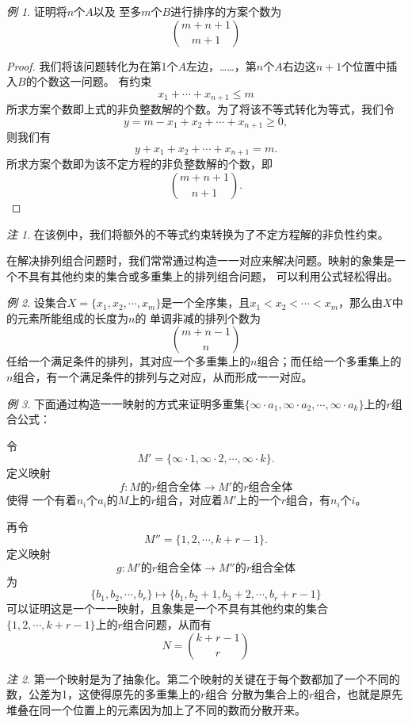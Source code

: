 \documentclass[a4paper,11pt]{article}%
\theoremstyle{remark}
\newtheorem*{remark}{注}
\theoremstyle{remark}
\newtheorem*{example}{例}
\theoremstyle{definition}
\theoremstyle{definition}
\theoremstyle{definition}
\begin{document}
\begin{example}
    证明将$n$个$A$以及 至多$m$个$B$进行排序的方案个数为
    \[\binom{m+n+1}{m+1}\]
    \begin{proof}
        我们将该问题转化为在第1个$A$左边，……，第$n$个$A$右边这$n+1$个位置中插入$B$的个数这一问题。
        有约束
        \[x_1+\cdots+x_{n+1}\leq m\]
        所求方案个数即上式的非负整数解的个数。为了将该不等式转化为等式，我们令
        \[y=m-x_1+x_2+\cdots+x_{n+1}\geq 0,\]
        则我们有
        \[y+x_1+x_2+\cdots+x_{n+1}=m.\]
        所求方案个数即为该不定方程的非负整数解的个数，即
        \[\binom{m+n+1}{n+1}.\]
    \end{proof}
\end{example}
\begin{remark}
    在该例中，我们将额外的不等式约束转换为了不定方程解的非负性约束。
\end{remark}
在解决排列组合问题时，我们常常通过构造一一对应来解决问题。映射的象集是一个不具有其他约束的集合或多重集上的排列组合问题，
可以利用公式轻松得出。
\begin{example}
    设集合$X=\{x_1,x_2,\cdots,x_m\}$是一个全序集，且$x_1<x_2<\cdots<x_m$，那么由$X$中的元素所能组成的长度为$n$的
    单调非减的排列个数为
    \[\binom{m+n-1}{n}\]
    任给一个满足条件的排列，其对应一个多重集上的$n$组合；而任给一个多重集上的$n$组合，有一个满足条件的排列与之对应，从而形成一一对应。
\end{example}
\begin{example}
    下面通过构造一一映射的方式来证明多重集$\{\infty\cdot a_1,\infty\cdot a_2,\cdots,\infty\cdot a_k\}$上的$r$组合公式：
    
    令
    \[M'=\{\infty\cdot 1,\infty\cdot 2,\cdots,\infty\cdot k\}.\]
    定义映射
    \[f:M\text{的}r\text{组合全体}\rightarrow M'\text{的}r\text{组合全体}\]
    使得 一个有着$n_i$个$a_i$的$M$上的$r$组合，对应着$M'$上的一个$r$组合，有$n_i$个$i$。
    
    再令
    \[M''=\{1,2,\cdots,k+r-1\}.\]
    定义映射 
    \[g:M'\text{的}r\text{组合全体}\rightarrow M''\text{的}r\text{组合全体}\]
    为
    \[\{b_1,b_2,\cdots,b_r\}\longmapsto \{b_1,b_2+1,b_3+2,\cdots,b_r+r-1\}\]
    可以证明这是一个一一映射，且象集是一个不具有其他约束的集合$\{1,2,\cdots,k+r-1\}$上的$r$组合问题，从而有
    \[N=\binom{k+r-1}{r}\]
\end{example}
\begin{remark}
    第一个映射是为了抽象化。第二个映射的关键在于每个数都加了一个不同的数，公差为1，这使得原先的多重集上的$r$组合
    分散为集合上的$r$组合，也就是原先堆叠在同一个位置上的元素因为加上了不同的数而分散开来。
\end{remark}
\end{document}
